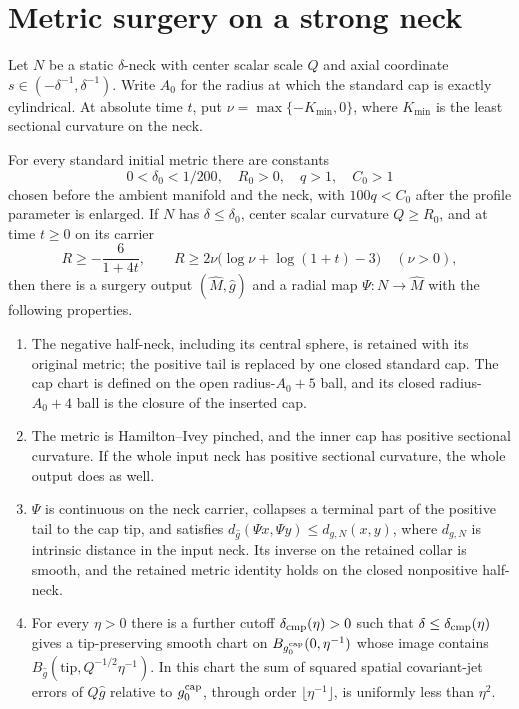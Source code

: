 \section{Metric surgery on a strong neck}
\label{sec:metric-surgery}

Let $N$ be a static $\delta$-neck with center scalar scale $Q$ and axial
coordinate $s\in(-\delta^{-1},\delta^{-1})$.  Write $A_0$ for the radius at
which the standard cap is exactly cylindrical.  At absolute time $t$, put
$\nu=\max\{-K_{\min},0\}$, where $K_{\min}$ is the least sectional
curvature on the neck.

\begin{theorem}
\label{thm:metric-surgery}
For every standard initial metric there are constants
\[
 0<\delta_0<1/200,\quad R_0>0,\quad q>1,\quad C_0>1
\]
chosen before the ambient manifold and the neck, with $100q<C_0$ after the
profile parameter is enlarged.  If $N$ has $\delta\leq\delta_0$, center scalar
curvature $Q\geq R_0$, and at time $t\geq0$ on its carrier
\[
 R\geq-\frac{6}{1+4t},\qquad
 R\geq2\nu\bigl(\log\nu+\log(1+t)-3\bigr)\quad(\nu>0),
\]
then there is a surgery output $(\widehat M,\widehat g)$ and a radial map
$\Psi:N\longrightarrow\widehat M$ with the following properties.

\begin{enumerate}
\item The negative half-neck, including its central sphere, is retained with
  its original metric; the positive tail is replaced by one closed standard
  cap.  The cap chart is defined on the open radius-$A_0+5$ ball, and its
  closed radius-$A_0+4$ ball is the closure of the inserted cap.
\item The metric is Hamilton--Ivey pinched, and the inner cap has positive
  sectional curvature.  If the whole input neck has positive sectional
  curvature, the whole output does as well.
\item $\Psi$ is continuous on the neck carrier, collapses a terminal part
  of the positive tail to the cap tip, and satisfies
  $d_{\widehat g}(\Psi x,\Psi y)\leq d_{g,N}(x,y)$,
  where $d_{g,N}$ is intrinsic distance in the input neck.
  Its inverse on the retained collar
  is smooth, and the retained metric identity holds on the closed
  nonpositive half-neck.
\item For every $\eta>0$ there is a further cutoff
  $\delta_{\rm cmp}(\eta)>0$ such that $\delta\leq\delta_{\rm cmp}(\eta)$
  gives a tip-preserving smooth chart on
  $B_{g_0^{\rm cap}}(0,\eta^{-1})$ whose image contains
  $B_{\widehat g}(\mathrm{tip},Q^{-1/2}\eta^{-1})$.
  In this chart the sum of squared spatial covariant-jet errors of
  $Q\widehat g$ relative to $g_0^{\rm cap}$, through order
  $\lfloor\eta^{-1}\rfloor$, is uniformly less than $\eta^2$.
\end{enumerate}
\cite[Theorem 13.2 and Lemma 13.4, pp. 332--334;
Corollary 13.12, pp. 339--340]{MT2007}
\end{theorem}

